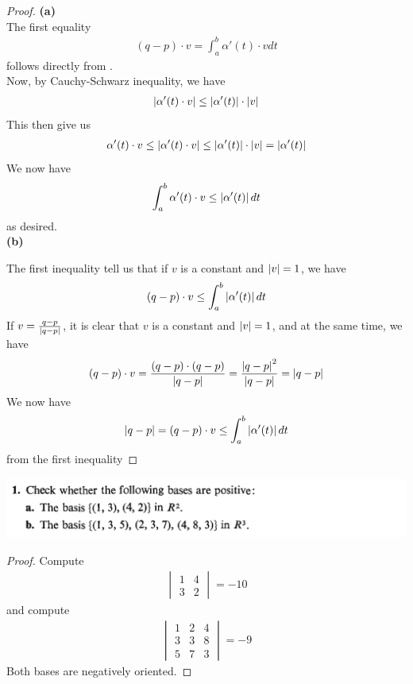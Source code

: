 \documentclass{report}
\begin{document}
\begin{proof}
\textbf{(a)}\\


The first equality 
\begin{align*}
  (q-p)\cdot v=\int_a^b \alpha '(t)\cdot vdt
\end{align*}
follows directly from .\\

Now, by Cauchy-Schwarz inequality, we have 
\begin{align*}
  \left|\alpha '(t)\cdot v\right| \leq \left|\alpha '(t)\right|\cdot \left|v\right|
\end{align*}
This then give us 
\begin{align*}
\alpha '(t)\cdot v\leq \left|\alpha '(t)\cdot v\right|\leq \left|\alpha '(t)\right|\cdot \left|v\right|=\left|\alpha '(t)\right|
\end{align*}
We now have 
\begin{align*}
\int_a^b \alpha '(t)\cdot v \leq \left|\alpha '(t)\right|dt
\end{align*}
as desired.\\

\textbf{(b)}

The first inequality tell us that if $v$ is a constant and $\left|v\right|=1$, we have 
\begin{align*}
  (q-p)\cdot v \leq \int_a^b \left|\alpha '(t)\right|dt
\end{align*}
If $v=\frac{q-p}{\left|q-p\right|}$, it is clear that $v$ is a constant and  $\left|v\right|=1$, and at the same time, we have 
\begin{align*}
  (q-p)\cdot v=\frac{(q-p)\cdot (q-p)}{\left|q-p\right|}=\frac{\left|q-p\right|^2}{\left|q-p\right|}=\left|q-p\right|
\end{align*}
We now have 
\begin{align*}
\left|q-p\right|=(q-p)\cdot v \leq \int_a^b \left|\alpha '(t)\right|dt
\end{align*}
from the first inequality 
\end{proof}
\begin{question}{}{}
\includegraphics[height=2cm,width=18cm]{qu9}
\end{question}
\begin{proof}
Compute 
\begin{align*}
\begin{vmatrix} 
  1 & 4 \\
  3 & 2
\end{vmatrix}=-10
\end{align*}
and compute 
\begin{align*}
\begin{vmatrix}
  1& 2 & 4 \\
  3 & 3 & 8 \\
  5 & 7 & 3
\end{vmatrix}=-9
\end{align*}
Both bases are negatively oriented. 
\end{proof}
\end{document}
